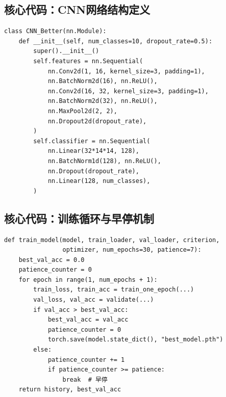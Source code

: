 \documentclass[12pt,a4paper]{ctexart}
\begin{document}
\subsection{核心代码：CNN网络结构定义}
\begin{lstlisting}
class CNN_Better(nn.Module):
    def __init__(self, num_classes=10, dropout_rate=0.5):
        super().__init__()
        self.features = nn.Sequential(
            nn.Conv2d(1, 16, kernel_size=3, padding=1),
            nn.BatchNorm2d(16), nn.ReLU(),
            nn.Conv2d(16, 32, kernel_size=3, padding=1),
            nn.BatchNorm2d(32), nn.ReLU(),
            nn.MaxPool2d(2, 2),
            nn.Dropout2d(dropout_rate),
        )
        self.classifier = nn.Sequential(
            nn.Linear(32*14*14, 128),
            nn.BatchNorm1d(128), nn.ReLU(),
            nn.Dropout(dropout_rate),
            nn.Linear(128, num_classes),
        )
\end{lstlisting}

\subsection{核心代码：训练循环与早停机制}
\begin{lstlisting}
def train_model(model, train_loader, val_loader, criterion,
                optimizer, num_epochs=30, patience=7):
    best_val_acc = 0.0
    patience_counter = 0
    for epoch in range(1, num_epochs + 1):
        train_loss, train_acc = train_one_epoch(...)
        val_loss, val_acc = validate(...)
        if val_acc > best_val_acc:
            best_val_acc = val_acc
            patience_counter = 0
            torch.save(model.state_dict(), "best_model.pth")
        else:
            patience_counter += 1
            if patience_counter >= patience:
                break  # 早停
    return history, best_val_acc
\end{lstlisting}
\end{document}
